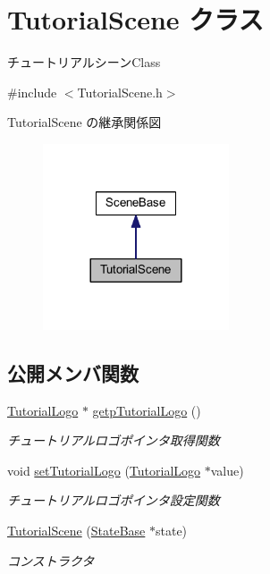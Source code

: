 \hypertarget{class_tutorial_scene}{}\section{Tutorial\+Scene クラス}
\label{class_tutorial_scene}


チュートリアルシーン\+Class  




{\ttfamily \#include $<$Tutorial\+Scene.\+h$>$}



Tutorial\+Scene の継承関係図\nopagebreak
\begin{figure}[H]
\begin{center}
\leavevmode
\includegraphics[width=156pt]{class_tutorial_scene__inherit__graph}
\end{center}
\end{figure}
\subsection*{公開メンバ関数}
\begin{DoxyCompactItemize}
\item 
\mbox{\hyperlink{class_tutorial_logo}{Tutorial\+Logo}} $\ast$ \mbox{\hyperlink{class_tutorial_scene_a9f1a224f8864ccd5ddfe5a8c894a4582}{getp\+Tutorial\+Logo}} ()
\begin{DoxyCompactList}\small\item\em チュートリアルロゴポインタ取得関数 \end{DoxyCompactList}\item 
void \mbox{\hyperlink{class_tutorial_scene_a7c8b448ac848d4811e448acf45c5a48e}{set\+Tutorial\+Logo}} (\mbox{\hyperlink{class_tutorial_logo}{Tutorial\+Logo}} $\ast$value)
\begin{DoxyCompactList}\small\item\em チュートリアルロゴポインタ設定関数 \end{DoxyCompactList}\item 
\mbox{\hyperlink{class_tutorial_scene_a90f8c010bd72aa3dae61a5294fdfbeb7}{Tutorial\+Scene}} (\mbox{\hyperlink{class_scene_base_1_1_state_base}{State\+Base}} $\ast$state)
\begin{DoxyCompactList}\small\item\em コンストラクタ \end{DoxyCompactList}\end{DoxyCompactItemize}
